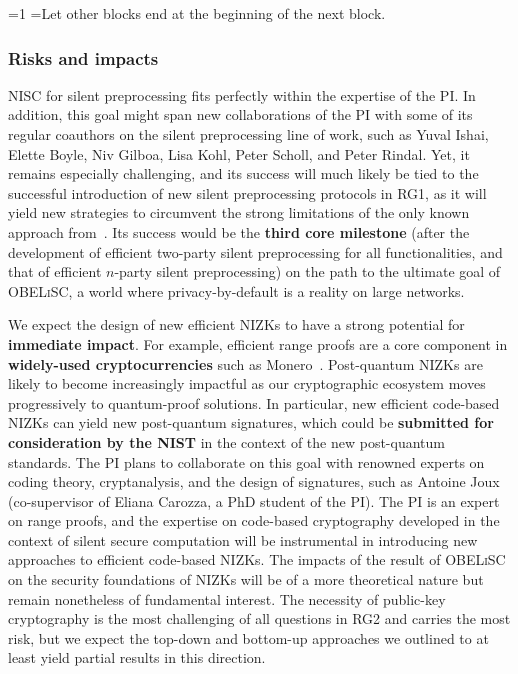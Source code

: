 \documentclass[oneside, a4paper, onecolumn, 11pt]{article}
\newcommand{\OBELiSC}{\textsc{OBELiSC}\xspace}
\newcounter{alphasect}
\def\alphainsection{0}
\newenvironment{alphasection}{%
  \ifnum\alphainsection=1%
    \errhelp={Let other blocks end at the beginning of the next block.}
    \errmessage{Nested Alpha section not allowed}
  \fi%
  \setcounter{alphasect}{0}
  \def\alphainsection{1}
}{%
  \setcounter{alphasect}{0}
  \def\alphainsection{0}
}%
\begin{document}
\begin{alphasection}
\subsubsection{Risks and impacts}

NISC for silent preprocessing fits perfectly within the expertise of the PI. In addition, this goal might span new collaborations of the PI with some of its regular coauthors on the silent preprocessing line of work, such as Yuval Ishai, Elette Boyle, Niv Gilboa, Lisa Kohl, Peter Scholl, and Peter Rindal. Yet, it remains especially challenging, and its success will much likely be tied to the successful introduction of new silent preprocessing protocols in RG1, as it will yield new strategies to circumvent the strong limitations of the only known approach from~\cite{EC:OrlSchYak21}. Its success would be the \textbf{third core milestone} (after the development of efficient two-party silent preprocessing for all functionalities, and that of efficient $n$-party silent preprocessing) on the path to the ultimate goal of \OBELiSC, a world where privacy-by-default is a reality on large networks.

We expect the design of new efficient NIZKs to have a strong potential for \textbf{immediate impact}. For example, efficient range proofs are a core component in \textbf{widely-used cryptocurrencies} such as Monero~\cite{monero}. Post-quantum NIZKs are likely to become increasingly impactful as our cryptographic ecosystem moves progressively to quantum-proof solutions. In particular, new efficient code-based NIZKs can yield new post-quantum signatures, which could be \textbf{submitted for consideration by the NIST} in the context of the new post-quantum standards. The PI plans to collaborate on this goal with renowned experts on coding theory, cryptanalysis, and the design of signatures, such as Antoine Joux (co-supervisor of Eliana Carozza, a PhD student of the PI). The PI is an expert on range proofs, and the expertise on code-based cryptography developed in the context of silent secure computation will be instrumental in introducing new approaches to efficient code-based NIZKs. The impacts of the result of \OBELiSC on the security foundations of NIZKs will be of a more theoretical nature but remain nonetheless of fundamental interest. The necessity of public-key cryptography is the most challenging of all questions in RG2 and carries the most risk, but we expect the top-down and bottom-up approaches we outlined to at least yield partial results in this direction.


\end{alphasection}
\end{document}

